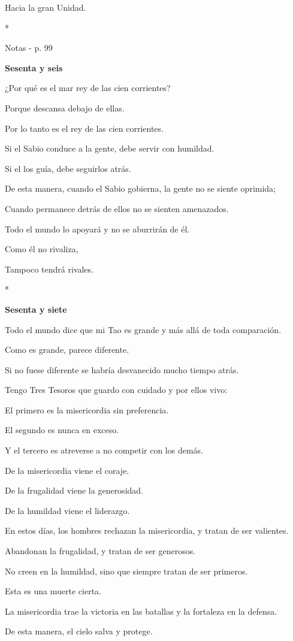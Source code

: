 Hacia la gran Unidad.

*

Notas - p. 99

\textbf{Sesenta y seis}

¿Por qué es el mar rey de las cien corrientes?

Porque descansa debajo de ellas.

Por lo tanto es el rey de las cien corrientes.

Si el Sabio conduce a la gente, debe servir con humildad.

Si el los guía, debe seguirlos atrás.

De esta manera, cuando el Sabio gobierna, la gente no se siente
oprimida;

Cuando permanece detrás de ellos no se sienten amenazados.

Todo el mundo lo apoyará y no se aburrirán de él.

Como él no rivaliza,

Tampoco tendrá rivales.

*

\textbf{Sesenta y siete}

Todo el mundo dice que mi Tao es grande y más allá de toda comparación.

Como es grande, parece diferente.

Si no fuese diferente se habría desvanecido mucho tiempo atrás.

Tengo Tres Tesoros que guardo con cuidado y por ellos vivo:

El primero es la misericordia sin preferencia.

El segundo es nunca en exceso.

Y el tercero es atreverse a no competir con los demás.

De la misericordia viene el coraje.

De la frugalidad viene la generosidad.

De la humildad viene el liderazgo.

En estos días, los hombres rechazan la misericordia, y tratan de ser
valientes.

Abandonan la frugalidad, y tratan de ser generosos.

No creen en la humildad, sino que siempre tratan de ser primeros.

Esta es una muerte cierta.

La misericordia trae la victoria en las batallas y la fortaleza en la
defensa.

De esta manera, el cielo salva y protege.


